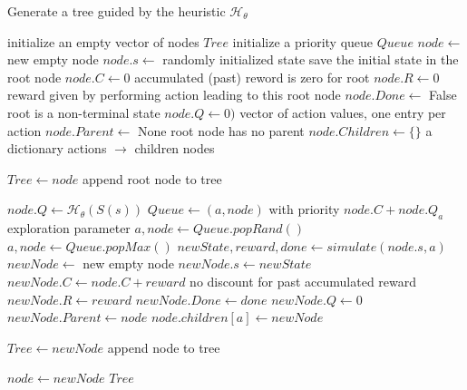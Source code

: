 \documentclass{article}
\begin{document}
\begin{algorithm}[h]
  \caption{Generate a tree guided by the heuristic ${\mathcal H}_\theta$}
  \label{alg:gentree}
\begin{algorithmic}[1]
  \State initialize an empty vector of nodes $\mathit{Tree}$
  \State initialize a priority queue $\mathit{Queue}$
  \State $\mathit{node} \leftarrow$ new empty node
  \State $\mathit{node.s} \leftarrow$ randomly initialized state
  \Comment save the initial state in the root node
  \State $\mathit{node.C} \leftarrow 0$
  \Comment accumulated (past) reword is zero for root
  \State $\mathit{node.R} \leftarrow 0$
  \Comment reward given by performing action leading to this root node
  \State $\mathit{node.Done} \leftarrow$ False
  \Comment root is a non-terminal state
  \State $\mathit{node.Q} \leftarrow 0)$
  \Comment vector of action values, one entry per action  
  \State $\mathit{node.Parent} \leftarrow$ None
  \Comment root node has no parent
  \State $\mathit{node.Children} \leftarrow \{ \}$
  \Comment a dictionary actions $\rightarrow$ children nodes

  \State $\mathit{Tree} \leftarrow \mathit{node}$
  \Comment append root node to tree

  \Repeat
    \State $\mathit{node.Q} \leftarrow {\mathcal H}_\theta(S(s))$
      \State $\mathit{Queue} \leftarrow (a, \mathit{node})$ with priority $\mathit{node.C+\mathit{node.Q_a}}$
    \EndFor
    \EndIf
      \Comment exploration parameter
      \State $a, node \leftarrow \mathit{Queue.popRand()}$
    \Else
      \State $a, node \leftarrow \mathit{Queue.popMax()}$
    \EndIf
    \State $\mathit{newState, reward, done} \leftarrow \mathit{simulate(node.s, a)}$
    \State $\mathit{newNode} \leftarrow$ new empty node
    \State $\mathit{newNode.s} \leftarrow \mathit{newState}$
    \State $\mathit{newNode.C} \leftarrow \mathit{node.C + reward}$
    \Comment no discount for past accumulated reward
    \State $\mathit{newNode.R} \leftarrow \mathit{reward}$
    \State $\mathit{newNode.Done} \leftarrow \mathit{done}$
    \State $\mathit{newNode.Q} \leftarrow 0$
    \State $\mathit{newNode.Parent} \leftarrow \mathit{node}$
    \State $\mathit{node.children[a]} \leftarrow \mathit{newNode}$

    \State $\mathit{Tree} \leftarrow \mathit{newNode}$
    \Comment append node to tree    

    \State $\mathit{node} \leftarrow \mathit{newNode}$
   $\mathit{Tree}$
\end{algorithmic}
\end{algorithm}
\end{document}
